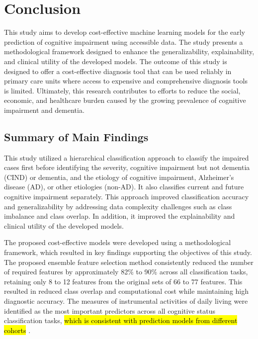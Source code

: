 \chapter{Conclusion}
\hspace{12.7mm}This study aims to develop cost-effective machine learning models for the early prediction of cognitive impairment using accessible data. The study presents a methodological framework designed to enhance the generalizability, explainability, and clinical utility of the developed models. The outcome of this study is designed to offer a cost-effective diagnosis tool that can be used reliably in primary care units where access to expensive and comprehensive diagnosis tools is limited. Ultimately, this research contributes to efforts to reduce the social, economic, and healthcare burden caused by the growing prevalence of cognitive impairment and dementia.

\section{Summary of Main Findings}
This study utilized a hierarchical classification approach to classify the impaired cases first before identifying the severity, cognitive impairment but not dementia (\acrshort{CIND}) or dementia, and the etiology of cognitive impairment, Alzheimer's disease (\acrshort{AD}), or other etiologies (non-AD). It also classifies current and future cognitive impairment separately. This approach improved classification accuracy and generalizability by addressing data complexity challenges such as class imbalance and class overlap. In addition, it improved the explainability and clinical utility of the developed models.

The proposed cost-effective models were developed using a methodological framework, which resulted in key findings supporting the objectives of this study. The proposed ensemble feature selection method consistently reduced the number of required features by approximately 82\% to 90\% across all classification tasks, retaining only 8 to 12 features from the original sets of 66 to 77 features. This resulted in reduced class overlap and computational cost while maintaining high diagnostic accuracy. The measures of instrumental activities of daily living were identified as the most important predictors across all cognitive status classification tasks, \hl{which is consistent with prediction models from different cohorts} \cite{Cui2024Prediction, Ren2025Using}.

